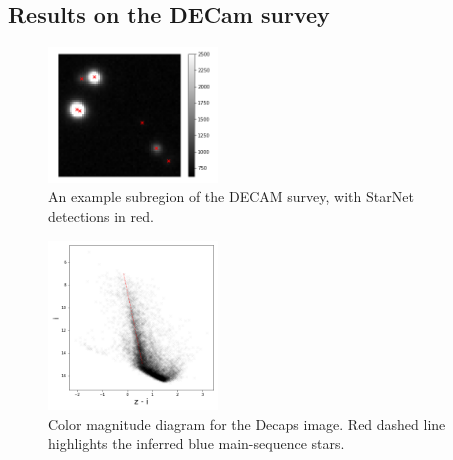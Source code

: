 \subsection{Results on the DECam survey}
\label{sec:results_on_decam}


\begin{figure}[tb]
    \centering
    \includegraphics[width=0.4\textwidth]{./figures/decaps/example_subimage_decaps.png}
    \vspace{-0.4cm}
    \caption{An example subregion of the DECAM survey, with StarNet detections in red.
    }
    \label{fig:decaps_cmd}
\end{figure}

\begin{figure}[tb]
    \centering
    \includegraphics[width=0.4\textwidth]{./figures/decaps/decaps_cmd.png}
    \vspace{-0.4cm}
    \caption{Color magnitude diagram for the Decaps image. Red dashed line highlights
    the inferred blue main-sequence stars. 
    }
    \label{fig:decaps_cmd}
\end{figure}
